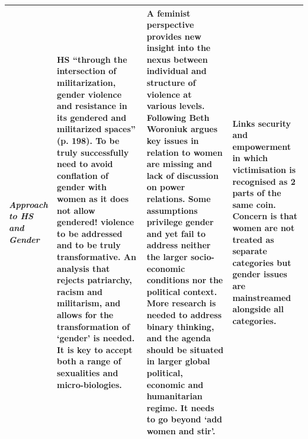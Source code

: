 \documentclass[10pt,a4paper]{article}
\begin{document}
\begin{table}[H]
\begin{footnotesize}
\begin{tabular}{L{3cm} L{4.2cm} L{4.2cm} L{4.2cm}}
\textit{Approach to HS and Gender} & HS ``through the intersection of militarization, gender violence and resistance in its gendered and militarized spaces'' (p. 198). To be truly successfully need to avoid conflation of gender with women as it does not allow gendered! violence to be addressed and to be truly transformative. An analysis that rejects patriarchy, racism and militarism, and allows for the transformation of `gender' is needed. It is key to accept both a range of sexualities and micro-biologies. & A feminist perspective provides new insight into the nexus between individual and structure of violence at various levels. Following Beth Woroniuk argues key issues in relation to women are missing and lack of discussion on power relations.  Some assumptions privilege gender and yet fail to address neither the larger socio-economic conditions nor the political context. More research is needed to address binary thinking, and the agenda should be situated in larger global political, economic and humanitarian regime. It needs to go beyond `add women and stir'. & Links security and empowerment in which victimisation is recognised as 2 parts of the same coin. Concern is that women are not treated as separate categories but gender issues are mainstreamed alongside all categories. \\
\bottomrule
\end{tabular}
\end{footnotesize}
\end{table}
%
%
%
%
\end{document}
